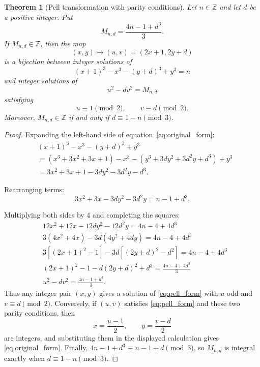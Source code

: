 \documentclass{mcom-l}
\newtheorem{theorem}{Theorem}[section]
\theoremstyle{definition}
\theoremstyle{remark}
\numberwithin{equation}{section}
\begin{document}
\begin{theorem}[Pell transformation with parity conditions]
\label{thm:transformation}
Let $n\in\mathbb Z$ and let $d$ be a positive integer.  Put
\[
        M_{n,d}=\frac{4n-1+d^3}{3}.
\]
If $M_{n,d}\in\mathbb Z$, then the map
\[
        (x,y)\longmapsto (u,v)=(2x+1,2y+d)
\]
is a bijection between integer solutions of
\begin{equation}
(x+1)^3 - x^3 - (y+d)^3 + y^3 = n
\label{eq:original_form}
\end{equation}
and integer solutions of
\begin{equation}
u^2 - d v^2 = M_{n,d}
\label{eq:pell_form}
\end{equation}
satisfying
\[
        u\equiv 1\pmod 2,\qquad v\equiv d\pmod 2.
\]
Moreover, $M_{n,d}\in\mathbb Z$ if and only if
$d\equiv 1-n\pmod 3$.
\end{theorem}

\begin{proof}
Expanding the left-hand side of equation~\eqref{eq:original_form}:
\begin{align*}
&(x+1)^3 - x^3 - (y+d)^3 + y^3 \\
&= (x^3 + 3x^2 + 3x + 1) - x^3
     - (y^3 + 3d y^2 + 3d^2y + d^3) + y^3 \\
&= 3x^2 + 3x + 1 - 3d y^2 - 3d^2y - d^3.
\end{align*}

Rearranging terms:
\begin{equation}
3x^2 + 3x - 3d y^2 - 3d^2y = n - 1 + d^3.
\end{equation}

Multiplying both sides by 4 and completing the squares:
\begin{align*}
&12x^2 + 12x - 12d y^2 - 12d^2y
       = 4n - 4 + 4d^3 \\
&3(4x^2 + 4x) - 3d(4y^2 + 4d y)
       = 4n - 4 + 4d^3 \\
&3[(2x+1)^2 - 1] - 3d[(2y+d)^2 - d^2]
       = 4n - 4 + 4d^3 \\
&(2x+1)^2 - 1 - d(2y+d)^2 + d^3
       = \frac{4n - 4 + 4d^3}{3} \\
&u^2 - d v^2 = \frac{4n - 1 + d^3}{3}.
\end{align*}
Thus any integer pair $(x,y)$ gives a solution of
\eqref{eq:pell_form} with $u$ odd and $v\equiv d\pmod2$.
Conversely, if $(u,v)$ satisfies \eqref{eq:pell_form} and these two
parity conditions, then
\[
        x=\frac{u-1}{2},\qquad y=\frac{v-d}{2}
\]
are integers, and substituting them in the displayed calculation gives
\eqref{eq:original_form}.  Finally,
$4n-1+d^3\equiv n-1+d\pmod3$, so
$M_{n,d}$ is integral exactly when
$d\equiv 1-n\pmod3$.
\end{proof}
\end{document}

